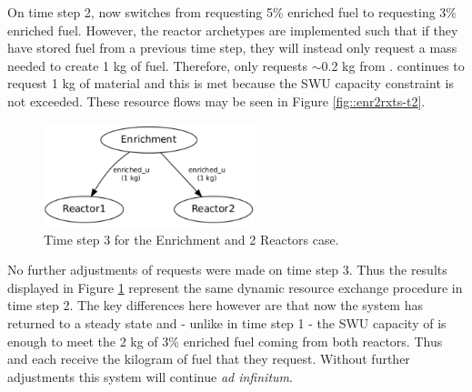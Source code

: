 On time step 2,  now switches from requesting 5\% enriched fuel to
requesting 3\% enriched fuel.  However, the reactor archetypes are implemented
such that if they have stored fuel from a previous time step, they will instead
only request a mass needed to create 1 kg of fuel.  Therefore,  only
requests $\sim$0.2 kg from \Enrichment{}.   continues to request 1 kg
of material and this is met because the SWU capacity constraint is not exceeded.
These resource flows may be seen in Figure \ref{fig::enr2rxts-t2}.

\begin{figure}
  \begin{center}
    \includegraphics[height=3cm]{./figs/1_Enrichment_2_Reactor-t3.pdf}
    \caption[]{\label{fig::enr2rxts-t3}Time step 3 for the Enrichment and 2 Reactors 
        case.}
  \end{center}
\end{figure}

No further adjustments of requests were made on time step 3. Thus the results 
displayed in Figure \ref{fig::enr2rxts-t3} represent the same dynamic resource 
exchange procedure in time step 2.  The key differences here however are that 
now the system has returned to a steady state and - unlike in time step 1 - 
the SWU capacity of \Enrichment{} is enough to meet the 2 kg of 3\% enriched
fuel coming from both reactors.  Thus  and  each receive 
the kilogram of fuel that they request.  Without further adjustments this 
system will continue \emph{ad infinitum}.

